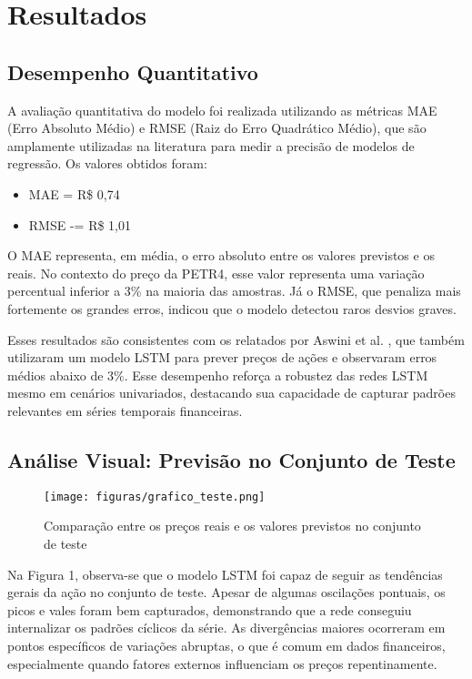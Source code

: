 \documentclass[conference]{IEEEtran}
\begin{document}
\section{Resultados}
\subsection{Desempenho Quantitativo}
A avaliação quantitativa do modelo foi realizada utilizando as métricas MAE (Erro Absoluto Médio) e RMSE (Raiz do Erro Quadrático Médio), que são amplamente utilizadas na literatura para medir a precisão de modelos de regressão. Os valores obtidos foram:

\begin{itemize}
    \item MAE = R\$ 0{,}74
    \item RMSE -= R\$ 1{,}01
\end{itemize}

O MAE representa, em média, o erro absoluto entre os valores previstos e os reais. No contexto do preço da PETR4, esse valor representa uma variação percentual inferior a 3\% na maioria das amostras. Já o RMSE, que penaliza mais fortemente os grandes erros, indicou que o modelo detectou raros desvios graves.

Esses resultados são consistentes com os relatados por Aswini et al. \cite{b4}, que também utilizaram um modelo LSTM para prever preços de ações e observaram erros médios abaixo de 3\%. Esse desempenho reforça a robustez das redes LSTM mesmo em cenários univariados, destacando sua capacidade de capturar padrões relevantes em séries temporais financeiras.

\subsection{Análise Visual: Previsão no Conjunto de Teste}
\begin{figure}[H]
\centering
\texttt{[image: figuras/grafico\_teste.png]}
\caption{Comparação entre os preços reais e os valores previstos no conjunto de teste}
\end{figure}

Na Figura 1, observa-se que o modelo LSTM foi capaz de seguir as tendências gerais da ação no conjunto de teste. Apesar de algumas oscilações pontuais, os picos e vales foram bem capturados, demonstrando que a rede conseguiu internalizar os padrões cíclicos da série. As divergências maiores ocorreram em pontos específicos de variações abruptas, o que é comum em dados financeiros, especialmente quando fatores externos influenciam os preços repentinamente.
\end{document}
